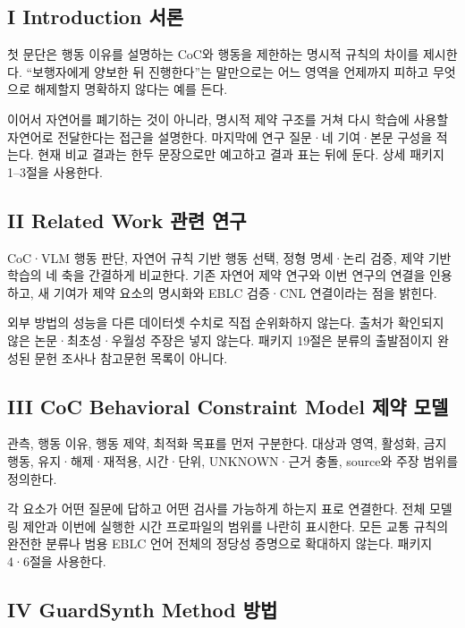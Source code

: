 \documentclass[11pt,a4paper]{article}
\begin{document}
\subsection*{I Introduction 서론}

첫 문단은 행동 이유를 설명하는 CoC와 행동을 제한하는 명시적 규칙의 차이를 제시한다. “보행자에게 양보한 뒤 진행한다”는 말만으로는 어느 영역을 언제까지 피하고 무엇으로 해제할지 명확하지 않다는 예를 든다.\par

이어서 자연어를 폐기하는 것이 아니라, 명시적 제약 구조를 거쳐 다시 학습에 사용할 자연어로 전달한다는 접근을 설명한다. 마지막에 연구 질문·네 기여·본문 구성을 적는다. 현재 비교 결과는 한두 문장으로만 예고하고 결과 표는 뒤에 둔다. 상세 패키지 1–3절을 사용한다.\par

\subsection*{II Related Work 관련 연구}

CoC·VLM 행동 판단, 자연어 규칙 기반 행동 선택, 정형 명세·논리 검증, 제약 기반 학습의 네 축을 간결하게 비교한다. 기존 자연어 제약 연구와 이번 연구의 연결을 인용하고, 새 기여가 제약 요소의 명시화와 EBLC 검증·CNL 연결이라는 점을 밝힌다.\par

외부 방법의 성능을 다른 데이터셋 수치로 직접 순위화하지 않는다. 출처가 확인되지 않은 논문·최초성·우월성 주장은 넣지 않는다. 패키지 19절은 분류의 출발점이지 완성된 문헌 조사나 참고문헌 목록이 아니다.\par

\subsection*{III CoC Behavioral Constraint Model 제약 모델}

관측, 행동 이유, 행동 제약, 최적화 목표를 먼저 구분한다. 대상과 영역, 활성화, 금지 행동, 유지·해제·재적용, 시간·단위, UNKNOWN·근거 충돌, source와 주장 범위를 정의한다.\par

각 요소가 어떤 질문에 답하고 어떤 검사를 가능하게 하는지 표로 연결한다. 전체 모델링 제안과 이번에 실행한 시간 프로파일의 범위를 나란히 표시한다. 모든 교통 규칙의 완전한 분류나 범용 EBLC 언어 전체의 정당성 증명으로 확대하지 않는다. 패키지 4·6절을 사용한다.\par

\subsection*{IV GuardSynth Method 방법}
\end{document}
